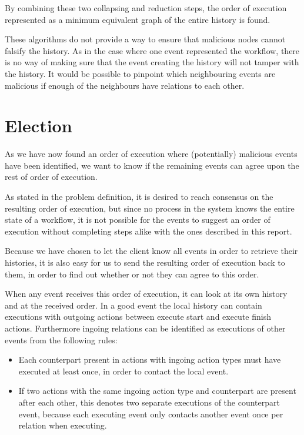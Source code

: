 	\newpar By combining these two collapsing and reduction steps, the order of execution represented as a minimum equivalent graph of the entire history is found. 
	
	\newpar These algorithms do not provide a way to ensure that malicious nodes cannot falsify the history. As in the case where one event represented the workflow, there is no way of making sure that the event creating the history will not tamper with the history. It would be possible to pinpoint which neighbouring events are malicious if enough of the neighbours have relations to each other. 

	\section{Election} 
	As we have now found an order of execution where (potentially) malicious events have been identified, we want to know if the remaining events can agree upon the rest of order of execution.
	
	\newpar As stated in the problem definition, it is desired to reach consensus on the resulting order of execution, but since no process in the system knows the entire state of a workflow, it is not possible for the events to suggest an order of execution without completing steps alike with the ones described in this report.
	
	\newpar Because we have chosen to let the client know all events in order to retrieve their histories, it is also easy for us to send the resulting order of execution back to them, in order to find out whether or not they can agree to this order.
	
	\newpar When any event receives this order of execution, it can look at its own history and at the received order. In a good event the local history can contain executions with outgoing actions between execute start and execute finish actions. Furthermore ingoing relations can be identified as executions of other events from the following rules:
	
	\begin{itemize}
		\item Each counterpart present in actions with ingoing action types must have executed at least once, in order to contact the local event.
		\item If two actions with the same ingoing action type and counterpart are present after each other, this denotes two separate executions of the counterpart event, because each executing event only contacts another event once per relation when executing.
	\end{itemize}
	
